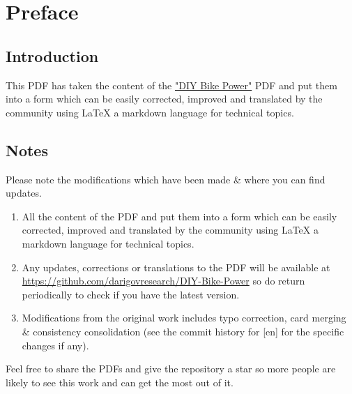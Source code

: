 \documentclass{article}
\theoremstyle{definition}
\theoremstyle{definition}
\theoremstyle{remark}
\begin{document}
\newpage

\tableofcontents

\newpage

\section{Preface} %
\label{sec:preface}

  \subsection*{Introduction} %
  \label{sub:introduction}
  
    This PDF has taken the content of the \href{https://www.demandenergyequality.org/build-your-own-bike-generators}{"DIY Bike Power"} PDF and put them into a form which can be easily corrected, improved and translated by the community using LaTeX a markdown language for technical topics.


  \subsection*{Notes} %
  \label{sub:notes}

    Please note the modifications which have been made \& where you can find updates.

    \begin{enumerate}
      \item All the content of the PDF and put them into a form which can be easily corrected, improved and translated by the community using LaTeX a markdown language for technical topics.
      \item Any updates, corrections or translations to the PDF will be available at \href{https://github.com/darigovresearch/DIY-Bike-Power}{https://github.com/darigovresearch/DIY-Bike-Power} so do return periodically to check if you have the latest version.
      \item Modifications from the original work includes typo correction, card merging \& consistency consolidation (see the commit history for [en] for the specific changes if any).
    \end{enumerate}

    Feel free to share the PDFs and give the repository a star so more people are likely to see this work and can get the most out of it.

\end{document}
